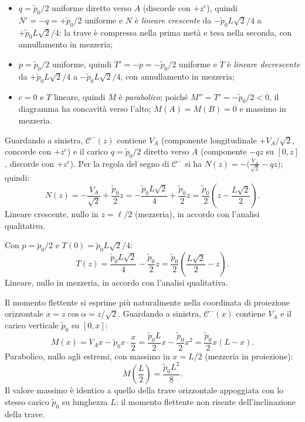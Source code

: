 \begin{esempio}
\begin{svolgimento}


		
		\begin{itemize}[nosep]
			\item $q = \tilde{p}_0/2$ uniforme diretto
			verso $A$ (discorde con $+z^e$), quindi
			$N' = -q = +\tilde{p}_0/2$ uniforme e
			$N$ è \emph{lineare crescente}
			da $-\tilde{p}_0L\sqrt{2}/4$ a
			$+\tilde{p}_0L\sqrt{2}/4$: la trave
			è compressa nella prima metà e
			tesa nella seconda, con
			annullamento in mezzeria;
			\item $p = \tilde{p}_0/2$ uniforme, quindi
			$T' = -p = -\tilde{p}_0/2$ uniforme
			e $T$ è \emph{lineare decrescente}
			da $+\tilde{p}_0L\sqrt{2}/4$ a
			$-\tilde{p}_0L\sqrt{2}/4$, con
			annullamento in mezzeria;
			\item $c = 0$ e $T$ lineare, quindi
			$M$ è \emph{parabolico}; poiché
			$M'' = T' = -\tilde{p}_0/2 < 0$,
			il diagramma ha concavità verso
			l'alto; $M(A) = M(B) = 0$ e
			massimo in mezzeria.
		\end{itemize}
		
		Guardando a sinistra, $\mathcal{C}^-(z)$
		contiene $V_A$ (componente longitudinale
		$+V_A/\sqrt{2}$, concorde con $+z^e$) e il
		carico $q = \tilde{p}_0/2$ diretto verso $A$
		(componente $-qz$ su $[0,z]$, discorde con
		$+z^e$). Per la regola del segno di
		$\mathcal{C}^-$ si ha
		$N(z) = -\bigl(\tfrac{V_A}{\sqrt{2}} - qz\bigr)$;
		quindi:
		\[
		N(z) = -\frac{V_A}{\sqrt{2}} + \frac{\tilde{p}_0}{2}z
		= -\frac{\tilde{p}_0L\sqrt{2}}{4}
		+ \frac{\tilde{p}_0}{2}z
		= \frac{\tilde{p}_0}{2}
		\!\left(z - \frac{L\sqrt{2}}{2}\right).
		\]
		Lineare crescente, nullo in $z = \ell/2$
		(mezzeria), in accordo con l'analisi qualitativa.
		
		Con $p = \tilde{p}_0/2$ e $T(0) =
		\tilde{p}_0L\sqrt{2}/4$:
		\[
		T(z) = \frac{\tilde{p}_0L\sqrt{2}}{4}
		- \frac{\tilde{p}_0}{2}z
		= \frac{\tilde{p}_0}{2}
		\!\left(\frac{L\sqrt{2}}{2} - z
		\right).
		\]
		Lineare, nullo in mezzeria, in accordo
		con l'analisi qualitativa.
		
		Il momento flettente si esprime più
		naturalmente nella coordinata di proiezione
		orizzontale $x = z\cos\alpha =
		z/\sqrt{2}$. Guardando a sinistra,
		$\mathcal{C}^-(x)$ contiene $V_A$ e il
		carico verticale $\tilde{p}_0$ su $[0,x]$:
		\[
		M(x) = V_A x - \tilde{p}_0x\cdot\frac{x}{2}
		= \frac{\tilde{p}_0L}{2}x
		- \frac{\tilde{p}_0}{2}x^2
		= \frac{\tilde{p}_0}{2}x(L - x).
		\]
		Parabolico, nullo agli estremi, con massimo
		in $x = L/2$ (mezzeria in proiezione):
		\[
		M\!\left(\frac{L}{2}\right)
		= \frac{\tilde{p}_0L^2}{8}.
		\]
		Il valore massimo è identico a quello della
		trave orizzontale appoggiata con lo stesso
		carico $\tilde{p}_0$ su lunghezza $L$: il
		momento flettente non risente
		dell'inclinazione della trave.
		


\end{svolgimento}
\end{esempio}
